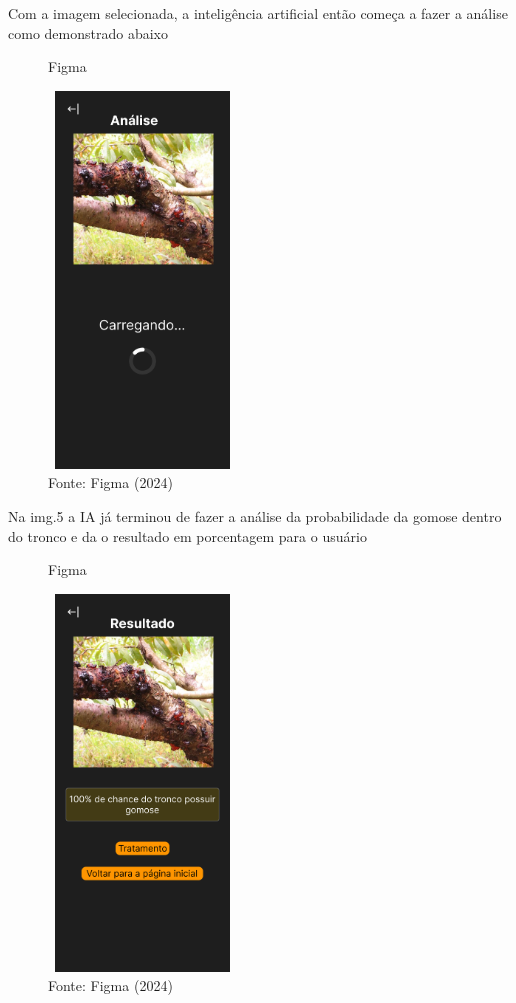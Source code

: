 \documentclass[
  a4paper,%
  12pt,%
  english,%
  brazilian,%
]{article}
\begin{document}
Com a imagem selecionada, a inteligência artificial então começa a fazer a análise como demonstrado abaixo

\begin{figure}[H]
    \centering
    \caption*{Figma}
    \includegraphics[width=5cm,height=10cm]{Illustrations/figma4.png}
    \caption*{Fonte: Figma (2024)}
    \label{fig:fig4}
\end{figure}

Na img.5 a IA já terminou de fazer a análise da probabilidade da gomose dentro do tronco e da o resultado em porcentagem para o usuário  

\begin{figure}[H]
    \centering
    \caption*{Figma}
    \includegraphics[width=5cm,height=10cm]{Illustrations/figma5.png}
    \caption*{Fonte: Figma (2024)}
    \label{fig:fig5}
\end{figure}
\end{document}
